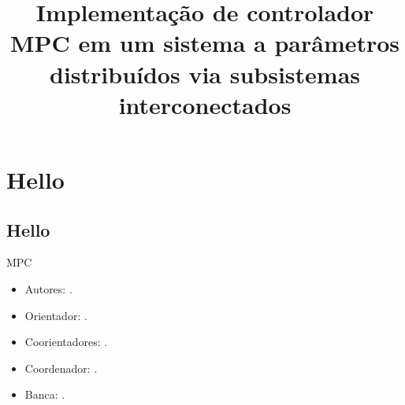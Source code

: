 \documentclass{tcc}
\title{Implementação de controlador MPC em um sistema a parâmetros distribuídos via subsistemas interconectados}
\begin{document}
    \maketitle{}
    
    \toc{}

    \chapter{Hello}%
    \label{chp:hello}

    \section{Hello}%
    \label{sec:hello}

    \ac{MPC}
    
    \begin{itemize}
        \item Autores: \getauthors{}.
        \item Orientador: \getorientador{}.
        \item Coorientadores: \getcoorientadores{}.
        \item Coordenador: \getcoordenador{}.
        \item Banca: .
    \end{itemize}
    
    \nocite{*}
    \printbibliography{}
\end{document}
